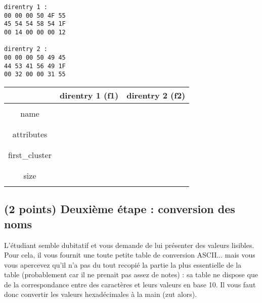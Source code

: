 \documentclass[11pt,a4paper]{article}
\begin{document}
\begin{table}[ht!]
  \centering
  \begin{minipage}{0.3\textwidth}
    \centering
\begin{lstlisting}[style=algorithmique]
direntry 1 :
00 00 00 50 4F 55
45 54 54 58 54 1F
00 14 00 00 00 12

direntry 2 :
00 00 00 50 49 45
44 53 41 56 49 1F
00 32 00 00 31 55
\end{lstlisting}
  \end{minipage}
  \hfillx
  \begin{minipage}{0.65\textwidth}
    \centering

\begin{tabular}{ | c | C{4cm} | C{4cm} | }
\hline
 & direntry 1 (f1) & direntry 2 (f2) \\
\hline
 & & \\
name & & \\
 & & \\
\hline
 & & \\
attributes & & \\
 & & \\
\hline
 & & \\
first\_cluster & & \\
 & & \\
\hline
 & & \\
size & & \\
 & & \\
\hline
\end{tabular}

  \end{minipage}
\end{table}

\bigskip

\subsection{(2 points) Deuxième étape : conversion des noms }

L'étudiant semble dubitatif et vous demande de lui présenter des valeurs lisibles.
Pour cela, il vous fournit une toute petite table de conversion ASCII... mais vous vous apercevez qu'il n'a pas du tout recopié la partie la plus essentielle de la table (probablement car il ne prenait pas assez de notes) : sa table ne dispose que de la correspondance entre des caractères et leurs valeurs en base 10.
Il vous faut donc convertir les valeurs hexadécimales à la main (zut alors).
\end{document}
